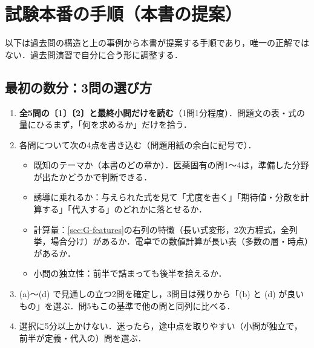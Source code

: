 \documentclass[a4paper,11pt,openany]{ltjsbook}
\begin{document}
\section{試験本番の手順（本書の提案）}\label{sec:G-plan}
以下は過去問の構造と上の事例から本書が提案する手順であり，唯一の正解ではない．過去問演習で自分に合う形に調整する．

\subsection{最初の数分：3問の選び方}
\begin{enumerate}
\item \textbf{全5問の〔1〕〔2〕と最終小問だけを読む}（1問1分程度）．問題文の表・式の量にひるまず，「何を求めるか」だけを拾う．
\item 各問について次の4点を書き込む（問題用紙の余白に記号で）．
  \begin{itemize}
  \item[(a)] 既知のテーマか（本書のどの章か）．医薬固有の問1〜4は，準備した分野が出たかどうかで判断できる．
  \item[(b)] 誘導に乗れるか：与えられた式を見て「尤度を書く」「期待値・分散を計算する」「代入する」のどれかに落とせるか．
  \item[(c)] 計算量：\cref{sec:G-features}の右列の特徴（長い式変形，2次方程式，全列挙，場合分け）があるか．電卓での数値計算が長い表（多数の層・時点）があるか．
  \item[(d)] 小問の独立性：前半で詰まっても後半を拾えるか．
  \end{itemize}
\item (a)〜(d) で見通しの立つ2問を確定し，3問目は残りから「(b) と (d) が良いもの」を選ぶ．問5もこの基準で他の問と同列に比べる．
\item 選択に5分以上かけない．迷ったら，途中点を取りやすい（小問が独立で，前半が定義・代入の）問を選ぶ．
\end{enumerate}
\end{document}
